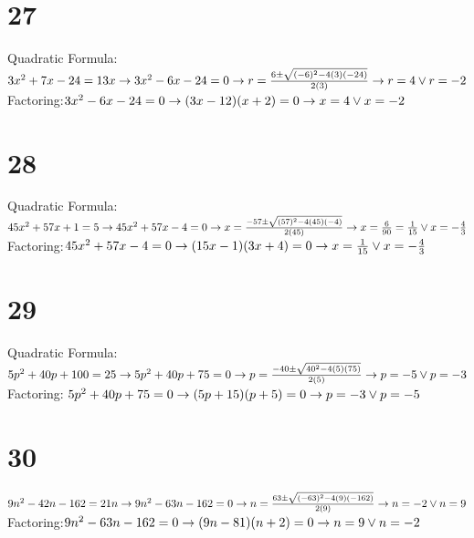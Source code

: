 \documentclass{article}
\theoremstyle{definition}
\begin{document}
\section*{27}
Quadratic Formula:\newline
$3x^2+7x-24=13x\newline\rightarrow 3x^2-6x-24=0\newline\rightarrow r=\frac{6\pm\sqrt{(-6)^2-4(3)(-24)}}{2(3)}\newline\rightarrow r=4\vee r=-2$\newline 
Factoring:\newline $3x^2-6x-24=0\newline\rightarrow (3x-12)(x+2)=0\newline\rightarrow x=4\vee x=-2$

\section*{28}
Quadratic Formula:\newline
$45x^2+57x+1=5\newline\rightarrow 45x^2+57x-4=0\newline\rightarrow x=\frac{-57\pm\sqrt{(57)^2-4(45)(-4)}}{2(45)}\newline\rightarrow x=\frac{6}{90}=\frac{1}
{15}
\vee x=-\frac{4}{3}$\newline 
Factoring:\newline $45x^2+57x-4=0\newline\rightarrow (15x-1)(3x+4)=0\newline\rightarrow x=\frac{1}{15}\vee x=-\frac{4}{3}$

\section*{29}
Quadratic Formula:\newline 
$5p^2+40p+100=25\newline\rightarrow 5p^2+40p+75=0\newline\rightarrow p=\frac{-40\pm\sqrt{40^2-4(5)(75)}}{2(5)}\newline\rightarrow p=-5\vee p=-3$\newline 
Factoring:\newline
$5p^2+40p+75=0\newline\rightarrow (5p+15)(p+5)=0\newline\rightarrow p=-3\vee p=-5$

\section*{30}
$9n^2-42n-162=21n\newline\rightarrow 9n^2-63n-162=0\newline\rightarrow n=\frac{63\pm\sqrt{(-63)^2-4(9)(-162)}}{2(9)}\newline\rightarrow n=-2\vee n=9$
\newline Factoring:\newline $9n^2-63n-162=0\newline\rightarrow (9n-81)(n+2)=0\newline\rightarrow n=9\vee n=-2$
\end{document}
